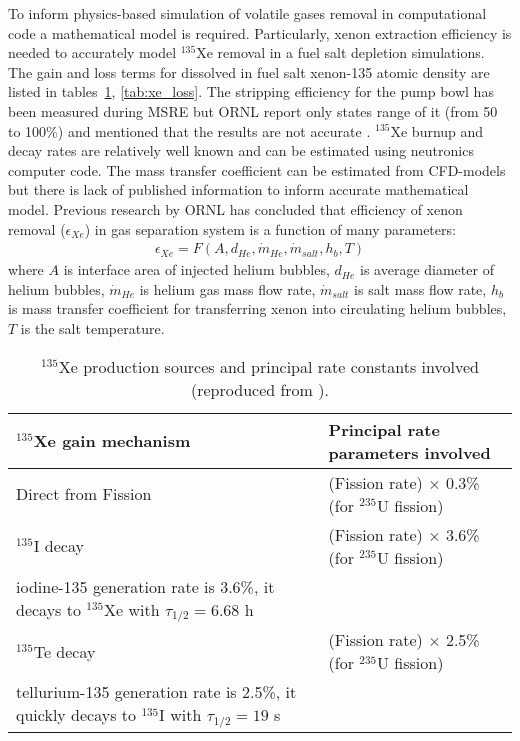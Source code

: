 To inform physics-based simulation of volatile gases removal in  
computational code a mathematical model is required. Particularly, xenon 
extraction efficiency is needed to accurately model $^{135}$Xe removal in 
a fuel salt 
depletion simulations. The gain and loss terms for dissolved in fuel salt 
xenon-135 atomic density are listed in tables~\ref{tab:xe_gain}, \ref{tab:xe_loss}. 
The stripping 
efficiency for the pump bowl has been measured during \gls{MSRE} but \gls{ORNL} report only states range of it (from 50 to 100\%) and mentioned that the results are not 
accurate \cite{kedl_development_1967}. $^{135}$Xe burnup and 
decay rates are relatively well known and can be estimated using neutronics 
computer code. The mass transfer coefficient can be estimated from CFD-models but 
there is lack of published information to inform accurate mathematical model. 
Previous research by \gls{ORNL} \cite{kedl_development_1967, engel_xenon_1971} has 
concluded that efficiency of xenon removal ($\epsilon_{Xe}$) in gas separation 
system is a function of many parameters:
\begin{align}
\epsilon_{Xe} = F (A, d_{He}, \dot{m}_{He}, \dot{m}_{salt}, h_b, T)
\end{align}
where $A$ is interface area of injected helium bubbles, $d_{He}$ is average diameter 
of helium bubbles, $\dot{m}_{He}$ is helium gas mass flow rate, $\dot{m}_{salt}$ is 
salt mass flow rate, $h_b$ is mass transfer coefficient for transferring xenon into 
circulating helium bubbles, $T$ is the salt temperature. 
\begin{table}[ht!]
\caption{$^{135}$Xe production sources and principal rate constants involved
 (reproduced from \cite{kedl_development_1967}).}
  \centering
\begin{tabularx}{\textwidth}{b | b}
\hline \textbf{$^{135}$Xe gain mechanism}      & \textbf{Principal rate 
parameters involved}  	\\
\hline Direct from Fission   & (Fission rate) $\times$ 0.3\% (for $^{235}$U fission) \\
\hline $^{135}$I decay       & (Fission rate) $\times$ 3.6\% (for $^{235}$U fission) \\
iodine-135 generation rate is 3.6\%, 
it decays to $^{135}$Xe with $\tau_{1/2}=6.68$ h & 			                    \\		\hline $^{135}$Te decay      & (Fission rate) $\times$ 2.5\% (for $^{235}$U fission) \\
tellurium-135 generation rate is 2.5\%, 
it quickly decays to $^{135}$I with $\tau_{1/2}=19$ s & 			                    \\					
\hline 
\end{tabularx}
  		\label{tab:xe_gain}
\end{table}
